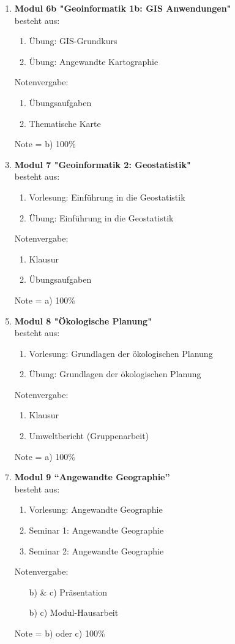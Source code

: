 \begin{enumerate}
 \item \textbf{Modul 6b "Geoinformatik 1b: GIS Anwendungen"}  \\ besteht aus:
  \begin{enumerate}
   \item Übung: GIS-Grundkurs
   \item Übung: Angewandte Kartographie
  \end{enumerate}
  Notenvergabe:
  \begin{enumerate}
   \item Übungsaufgaben
   \item Thematische Karte
  \end{enumerate}
  \item[] Note = b) 100\%
    
 \item \textbf{Modul 7 "Geoinformatik 2: Geostatistik"}  \\ besteht aus:
  \begin{enumerate}
   \item Vorlesung: Einführung in die Geostatistik
   \item Übung: Einführung in die Geostatistik
  \end{enumerate}
  Notenvergabe:
  \begin{enumerate}
   \item Klausur
   \item Übungsaufgaben
  \end{enumerate}
  \item[] Note = a) 100\%

 \item \textbf{Modul 8 "Ökologische Planung"}  \\ besteht aus:
  \begin{enumerate}
   \item Vorlesung: Grundlagen der ökologischen Planung
   \item Übung: Grundlagen der ökologischen Planung
  \end{enumerate}
  Notenvergabe:
  \begin{enumerate}
   \item Klausur
   \item Umweltbericht (Gruppenarbeit)
  \end{enumerate}
   \item[] Note = a) 100\%

 \item \textbf{Modul 9 ``Angewandte Geographie''}  \\ besteht aus:
  \begin{enumerate}
   \item Vorlesung: Angewandte Geographie
   \item Seminar 1: Angewandte Geographie
   \item Seminar 2: Angewandte Geographie
  \end{enumerate}
  Notenvergabe:
  \begin{enumerate}
   \item[b) \& c)] Präsentation
   \item[b) \ODER c)]Modul-Hausarbeit
  \end{enumerate}
  \item[] Note = b) oder c) 100\%


\end{enumerate}
